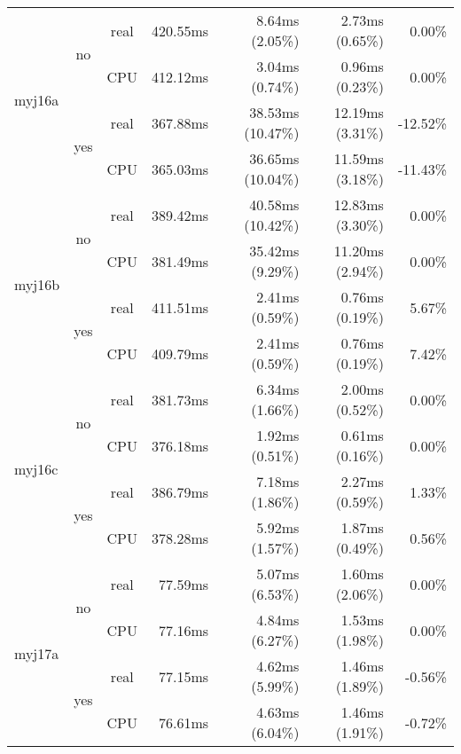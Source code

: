 \documentclass[en]{pracamgr}
\begin{document}
\begin{small}
\begin{longtable}{|l|c|c|r|r|r|r|}
\hline
\multirow{4}{*}{myj16a}   & \multirow{2}{*}{no}  & real & 420.55ms & 8.64ms (2.05\%) & 2.73ms (0.65\%) & 0.00\% \\*
                          &                      & CPU  & 412.12ms & 3.04ms (0.74\%) & 0.96ms (0.23\%) & 0.00\% \\*
                          \cline{2-7}
                          & \multirow{2}{*}{yes} & real & 367.88ms & 38.53ms (10.47\%) & 12.19ms (3.31\%) & -12.52\% \\*
                          &                      & CPU  & 365.03ms & 36.65ms (10.04\%) & 11.59ms (3.18\%) & -11.43\% \\
\hline
\multirow{4}{*}{myj16b}   & \multirow{2}{*}{no}  & real & 389.42ms & 40.58ms (10.42\%) & 12.83ms (3.30\%) & 0.00\% \\*
                          &                      & CPU  & 381.49ms & 35.42ms (9.29\%) & 11.20ms (2.94\%) & 0.00\% \\*
                          \cline{2-7}
                          & \multirow{2}{*}{yes} & real & 411.51ms & 2.41ms (0.59\%) & 0.76ms (0.19\%) & 5.67\% \\*
                          &                      & CPU  & 409.79ms & 2.41ms (0.59\%) & 0.76ms (0.19\%) & 7.42\% \\
\hline
\multirow{4}{*}{myj16c}   & \multirow{2}{*}{no}  & real & 381.73ms & 6.34ms (1.66\%) & 2.00ms (0.52\%) & 0.00\% \\*
                          &                      & CPU  & 376.18ms & 1.92ms (0.51\%) & 0.61ms (0.16\%) & 0.00\% \\*
                          \cline{2-7}
                          & \multirow{2}{*}{yes} & real & 386.79ms & 7.18ms (1.86\%) & 2.27ms (0.59\%) & 1.33\% \\*
                          &                      & CPU  & 378.28ms & 5.92ms (1.57\%) & 1.87ms (0.49\%) & 0.56\% \\
\hline
\multirow{4}{*}{myj17a}   & \multirow{2}{*}{no}  & real & 77.59ms & 5.07ms (6.53\%) & 1.60ms (2.06\%) & 0.00\% \\*
                          &                      & CPU  & 77.16ms & 4.84ms (6.27\%) & 1.53ms (1.98\%) & 0.00\% \\*
                          \cline{2-7}
                          & \multirow{2}{*}{yes} & real & 77.15ms & 4.62ms (5.99\%) & 1.46ms (1.89\%) & -0.56\% \\*
                          &                      & CPU  & 76.61ms & 4.63ms (6.04\%) & 1.46ms (1.91\%) & -0.72\% \\

\end{longtable}
\end{small}
\end{document}
